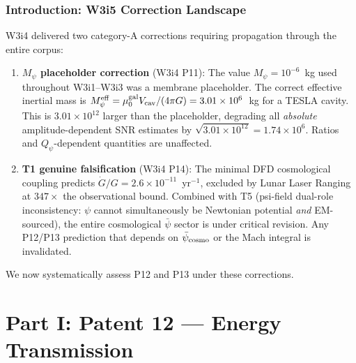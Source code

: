 \documentclass[aps,prd,twocolumn,superscriptaddress,nofootinbib]{revtex4-2}
\newcommand{\Qpsi}{Q_\psi}
\newcommand{\Meff}{M_\psi^{\rm eff}}
\newcommand{\ee}[1]{\times 10^{#1}}
\begin{document}
\maketitle

\section{Introduction: W3i5 Correction Landscape}
\label{sec:intro}

W3i4 delivered two category-A corrections requiring propagation through
the entire corpus:

\begin{enumerate}
\item \textbf{$M_\psi$ placeholder correction} (W3i4 P11): The value
  $M_\psi = 10^{-6}$~kg used throughout W3i1--W3i3 was a membrane
  placeholder. The correct effective inertial mass is
  $\Meff = \mu_0^{\rm gal} V_{\rm cav}/(4\pi G) = 3.01\ee{6}$~kg
  for a TESLA cavity. This is $3.01\ee{12}$ larger than the placeholder,
  degrading all \emph{absolute} amplitude-dependent SNR estimates by
  $\sqrt{3.01\ee{12}} = 1.74\ee{6}$. Ratios and $\Qpsi$-dependent
  quantities are unaffected.

\item \textbf{T1 genuine falsification} (W3i4 P14): The minimal DFD
  cosmological coupling predicts $\dot{G}/G = 2.6\ee{-11}$~yr$^{-1}$,
  excluded by Lunar Laser Ranging at $347\times$ the observational bound.
  Combined with T5 (psi-field dual-role inconsistency: $\psi$ cannot
  simultaneously be Newtonian potential \emph{and} EM-sourced), the
  entire cosmological $\bar{\psi}$ sector is under critical revision.
  Any P12/P13 prediction that depends on $\bar{\psi}_{\rm cosmo}$ or
  the Mach integral is invalidated.
\end{enumerate}

We now systematically assess P12 and P13 under these corrections.


\part*{Part I: Patent 12 --- Energy Transmission}
\end{document}
